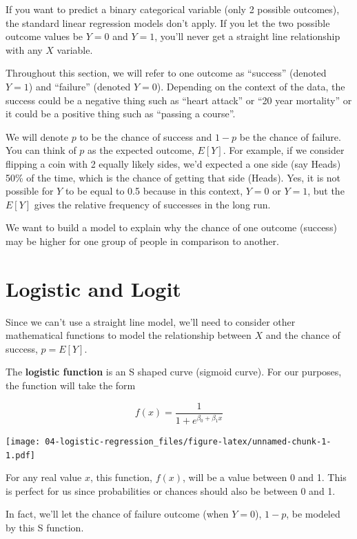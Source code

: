 \documentclass[
]{book}
\begin{document}
If you want to predict a binary categorical variable (only 2 possible outcomes), the standard linear regression models don't apply. If you let the two possible outcome values be \(Y=0\) and \(Y=1\), you'll never get a straight line relationship with any \(X\) variable.

Throughout this section, we will refer to one outcome as ``success'' (denoted \(Y=1\)) and ``failure'' (denoted \(Y=0\)). Depending on the context of the data, the success could be a negative thing such as ``heart attack'' or ``20 year mortality'' or it could be a positive thing such as ``passing a course''.

We will denote \(p\) to be the chance of success and \(1-p\) be the chance of failure. You can think of \(p\) as the expected outcome, \(E[Y]\). For example, if we consider flipping a coin with 2 equally likely sides, we'd expected a one side (say Heads) 50\% of the time, which is the chance of getting that side (Heads). Yes, it is not possible for \(Y\) to be equal to 0.5 because in this context, \(Y=0\) or \(Y=1\), but the \(E[Y]\) gives the relative frequency of successes in the long run.

We want to build a model to explain why the chance of one outcome (success) may be higher for one group of people in comparison to another.

\hypertarget{logistic-and-logit}{%
\section{Logistic and Logit}\label{logistic-and-logit}}

Since we can't use a straight line model, we'll need to consider other mathematical functions to model the relationship between \(X\) and the chance of success, \(p=E[Y]\).

The \textbf{logistic function} is an S shaped curve (sigmoid curve). For our purposes, the function will take the form

\[f(x) = \frac{1}{1 + e^{\beta_0 +\beta_1x}}\]

\texttt{[image: 04-logistic-regression\_files/figure-latex/unnamed-chunk-1-1.pdf]}

For any real value \(x\), this function, \(f(x)\), will be a value between 0 and 1. This is perfect for us since probabilities or chances should also be between 0 and 1.

In fact, we'll let the chance of failure outcome (when \(Y=0\)), \(1-p\), be modeled by this S function.
\end{document}
